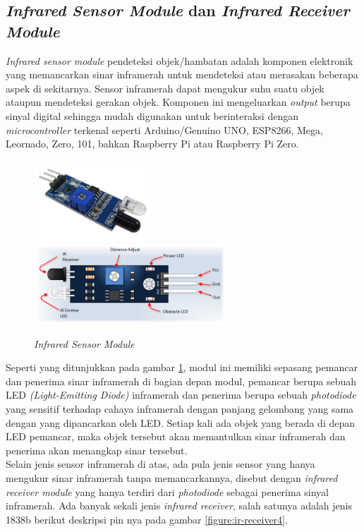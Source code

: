 \subsection{\textit{Infrared Sensor Module} dan \textit{Infrared Receiver Module}}
\tab \textit{Infrared sensor module} pendeteksi objek/hambatan adalah komponen elektronik yang memancarkan sinar inframerah untuk mendeteksi atau merasakan beberapa aspek di sekitarnya. Sensor inframerah dapat mengukur suhu suatu objek ataupun mendeteksi gerakan objek. Komponen ini mengeluarkan \textit{output} berupa sinyal digital sehingga mudah digunakan untuk berinteraksi dengan \textit{microcontroller} terkenal seperti Arduino/Genuino UNO, ESP8266, Mega, Leornado, Zero, 101, bahkan Raspberry Pi atau Raspberry Pi Zero.\\

\begin{figure}[H]
	\centerline {
		\includegraphics[height=3cm]{bab3/img/ir-sensor.png}
		\includegraphics[height=3cm]{bab3/img/ir-sensor-pin.png}
	}
	\caption{\textit{Infrared Sensor Module}}
	\label{figure:ir-sensor}
\end{figure}

Seperti yang ditunjukkan pada gambar \ref{figure:ir-sensor}, modul ini memiliki sepasang pemancar dan penerima sinar inframerah di bagian depan modul, pemancar berupa sebuah LED \textit{(Light-Emitting Diode)} inframerah dan penerima berupa sebuah \textit{photodiode} yang sensitif terhadap cahaya inframerah dengan panjang gelombang yang sama dengan yang dipancarkan oleh LED. Setiap kali ada objek yang berada di depan LED pemancar, maka objek tersebut akan memantulkan sinar inframerah dan penerima akan menangkap sinar tersebut. \\
\tab Selain jenis sensor inframerah di atas, ada pula jenis sensor yang hanya mengukur sinar inframerah tanpa memancarkannya, disebut dengan \textit{infrared receiver module} yang hanya terdiri dari \textit{photodiode} sebagai penerima sinyal inframerah. Ada banyak sekali jenis \textit{infrared receiver}, salah satunya adalah jenis 1838b berikut deskripsi pin nya pada gambar \ref{figure:ir-receiver4}.

